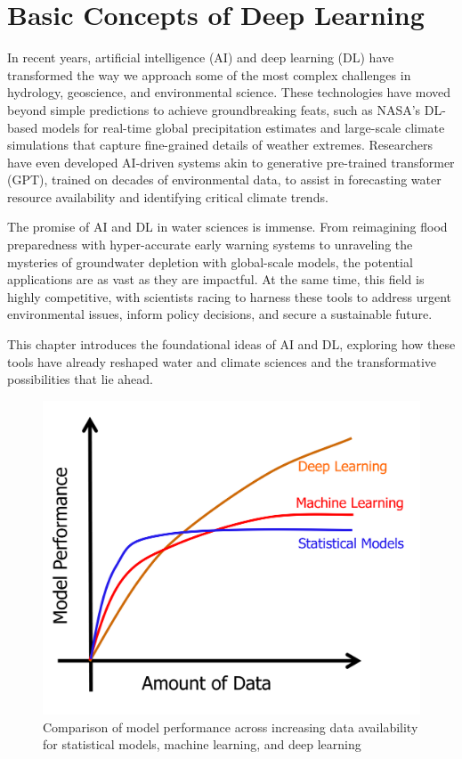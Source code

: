 \chapter{Basic Concepts of Deep Learning}

In recent years, artificial intelligence (AI) and deep learning (DL) have transformed the way we approach some of the most complex challenges in hydrology, geoscience, and environmental science. These technologies have moved beyond simple predictions to achieve groundbreaking feats, such as NASA’s DL-based models for real-time global precipitation estimates and large-scale climate simulations that capture fine-grained details of weather extremes. Researchers have even developed AI-driven systems akin to generative pre-trained transformer (GPT), trained on decades of environmental data, to assist in forecasting water resource availability and identifying critical climate trends.

The promise of AI and DL in water sciences is immense. From reimagining flood preparedness with hyper-accurate early warning systems to unraveling the mysteries of groundwater depletion with global-scale models, the potential applications are as vast as they are impactful. At the same time, this field is highly competitive, with scientists racing to harness these tools to address urgent environmental issues, inform policy decisions, and secure a sustainable future.

This chapter introduces the foundational ideas of AI and DL, exploring how these tools have already reshaped water and climate sciences and the transformative possibilities that lie ahead.

\begin{figure}[!h]
    \centering
    \includegraphics[width=1\linewidth]{images/What is DL.png}
    \caption{Comparison of model performance across increasing data availability for statistical models, machine learning, and deep learning}
    \label{fig:what_is_dl}
\end{figure}



